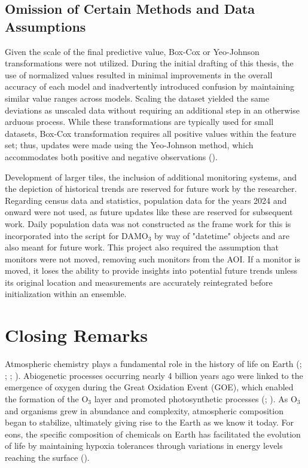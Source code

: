 \subsection{Omission of Certain Methods and Data Assumptions} \label{clcsn:comp} Given the scale of the final predictive value, Box-Cox or Yeo-Johnson transformations were not utilized. During the initial drafting of this thesis, the use of normalized values resulted in minimal improvements in the overall accuracy of each model and inadvertently introduced confusion by maintaining similar value ranges across models. Scaling the dataset yielded the same deviations as unscaled data without requiring an additional step in an otherwise arduous process. While these transformations are typically used for small datasets, Box-Cox transformation requires all positive values within the feature set; thus, updates were made using the Yeo-Johnson method, which accommodates both positive and negative observations (\cite{riani2023}).

Development of larger tiles, the inclusion of additional monitoring systems, and the depiction of historical trends are reserved for future work by the researcher. Regarding census data and statistics, population data for the years 2024 and onward were not used, as future updates like these are reserved for subsequent work. Daily population data was not constructed as the frame work for this is incorporated into the script for DAMO$_3$ by way of "datetime" objects and are also meant for future work. This project also required the assumption that monitors were not moved, removing such monitors from the AOI. If a monitor is moved, it loses the ability to provide insights into potential future trends unless its original location and measurements are accurately reintegrated before initialization within an ensemble. 
\section{Closing Remarks} \label{clcsn:closing} Atmospheric chemistry plays a fundamental role in the history of life on Earth (\cite{barzeghar_long-term_2020}; \cite{chapleski_heterogeneous_2016}; \cite{flynn_spatial_2021}; \cite{tanimoto_diagnosing_2008}). Abiogenetic processes occurring nearly 4 billion years ago were linked to the emergence of oxygen during the Great Oxidation Event (GOE), which enabled the formation of the O$_3$ layer and promoted photosynthetic processes (\cite{schell_reformulated_2002}; \cite{lyons_rise_2014}). As O$_3$ and organisms grew in abundance and complexity, atmospheric composition began to stabilize, ultimately giving rise to the Earth as we know it today. For eons, the specific composition of chemicals on Earth has facilitated the evolution of life by maintaining hypoxia tolerances through variations in energy levels reaching the surface (\cite{sperling_breathless_2022}).  

